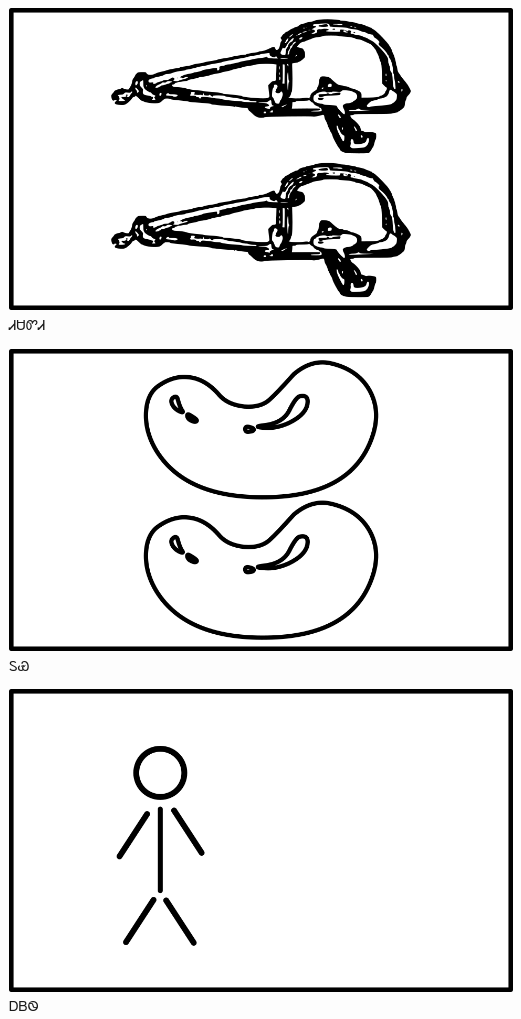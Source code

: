 \documentclass[avery5371]{flashcards}%
\begin{document}
\begin{flashcard}{
\includegraphics[width=0.95\columnwidth,height=.51\columnwidth,keepaspectratio]{../artwork/objects-neutral/tali-sadvdi}
}\Huge ᏗᏌᏛᏗ
\end{flashcard}

\begin{flashcard}{
\includegraphics[width=0.95\columnwidth,height=.51\columnwidth,keepaspectratio]{../artwork/objects-neutral/tali-tuya}
}\Huge ᏚᏯ
\end{flashcard}


\begin{flashcard}{
\includegraphics[width=0.95\columnwidth,height=.51\columnwidth,keepaspectratio]{../artwork/flags/ayvwi-no-flag}
}\Huge ᎠᏴᏫ
\end{flashcard}
\end{document}
